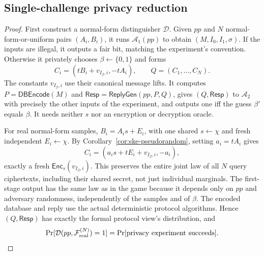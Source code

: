 \subsection{Single-challenge privacy reduction}
\label{app:privacy}
\begin{proof}
First construct a normal-form distinguisher \(\mathcal D\).
Given \(pp\) and \(N\) normal-form-or-uniform pairs \((A_i,B_i)\),
it runs \(\mathcal A_1(pp)\) to obtain \((M,I_0,I_1,\sigma)\). If the inputs are
illegal, it outputs a fair bit, matching the experiment's convention.
Otherwise it privately chooses \(\beta\leftarrow\{0,1\}\) and forms
\begin{equation}
\label{eq:reduction-query}
 C_i=(tB_i+v_{I_\beta,i},-tA_i),\qquad Q=(C_1,\ldots,C_N).
\end{equation}
The constants \(v_{I_\beta,i}\) use their canonical message lifts.
It computes \(P=\mathsf{DBEncode}(M)\) and
\(\mathsf{Resp}=\mathsf{ReplyGen}(pp,P,Q)\), gives
\((Q,\mathsf{Resp})\) to \(\mathcal A_2\) with precisely the other inputs
of the experiment, and outputs one iff the guess \(\beta'\) equals \(\beta\).
It needs neither \(s\) nor an encryption or decryption oracle.

For real normal-form samples, \(B_i=A_i s+E_i\), with one shared
\(s\leftarrow\chi\) and fresh independent \(E_i\leftarrow\chi\).
By Corollary~\ref{cor:ske-pseudorandom}, setting \(a_i=tA_i\) gives
\[
 C_i=(a_i s+tE_i+v_{I_\beta,i},-a_i),
\]
exactly a fresh \(\mathsf{Enc}_s(v_{I_\beta,i})\). This preserves the
entire joint law of all \(N\) query ciphertexts, including their shared
secret, not just individual marginals. The first-stage output has the
same law as in the game because it depends only on \(pp\) and adversary
randomness, independently of the samples and of \(\beta\).
The encoded database and reply use the actual deterministic protocol
algorithms. Hence \((Q,\mathsf{Resp})\) has exactly the formal protocol
view's distribution, and
\[
 \Pr[\mathcal D(pp,\mathcal F_{\rm real}^{(N)})=1]
   =\Pr[\text{privacy experiment succeeds}].
\]


\end{proof}
